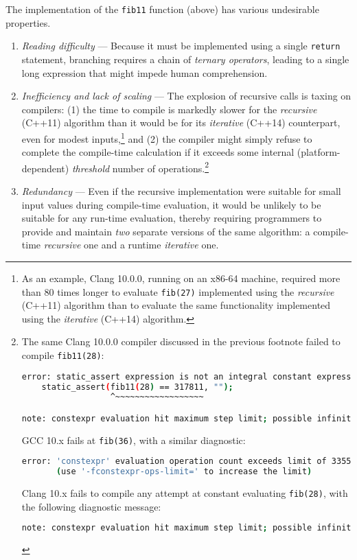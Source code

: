 \noindent The implementation of the \lstinline!fib11! function (above) has various
undesirable properties.
\begin{enumerate}
\item{\emph{Reading difficulty} — Because it must be implemented using a single \lstinline!return! statement, branching requires a chain of \emph{ternary operators}, leading to a single long expression that might impede human comprehension.}\pagebreak%
\item{\emph{Inefficiency and lack of scaling} — The explosion of recursive calls is taxing on compilers: (1) the time to compile is markedly slower for the \emph{recursive} (C++11) algorithm than it would be for its \emph{iterative} (C++14) counterpart, even for modest inputs,{\cprotect\footnote{As an example, Clang 10.0.0, running on an x86-64 machine, required more than 80 times longer to evaluate \lstinline!fib(27)! implemented using the \emph{recursive} (C++11) algorithm than to evaluate the same functionality implemented using the \emph{iterative} (C++14) algorithm.}} and (2) the compiler might simply refuse to complete the compile-time calculation if it exceeds some internal (platform-dependent) \emph{threshold} number of operations.{\cprotect\footnote{The same Clang 10.0.0 compiler discussed in the previous footnote failed to compile \lstinline!fib11(28)!:

\begin{lstlisting}[language=bash,style=footcodeplain]
error: static_assert expression is not an integral constant expression
    static_assert(fib11(28) == 317811, "");
                  ^~~~~~~~~~~~~~~~~~~

note: constexpr evaluation hit maximum step limit; possible infinite loop?
\end{lstlisting}

\noindent GCC 10.x fails at \lstinline!fib(36)!, with a similar diagnostic:

\begin{lstlisting}[language=bash,style=footcodeplain]
error: 'constexpr' evaluation operation count exceeds limit of 33554432
       (use '-fconstexpr-ops-limit=' to increase the limit)
\end{lstlisting}

\noindent Clang 10.x fails to compile any attempt at constant evaluating \lstinline!fib(28)!, with the following diagnostic \mbox{message}:

\begin{lstlisting}[language=bash,style=footcodeplain]
note: constexpr evaluation hit maximum step limit; possible infinite loop?
\end{lstlisting}
}} %
} %
\item{\emph{Redundancy} — Even if the recursive implementation were suitable for small input values during compile-time evaluation, it would be unlikely to be suitable for any run-time evaluation, thereby requiring programmers to provide and maintain \emph{two} separate versions of the same algorithm: a compile-time \emph{recursive} one and a runtime \emph{iterative} one.}
\end{enumerate}

